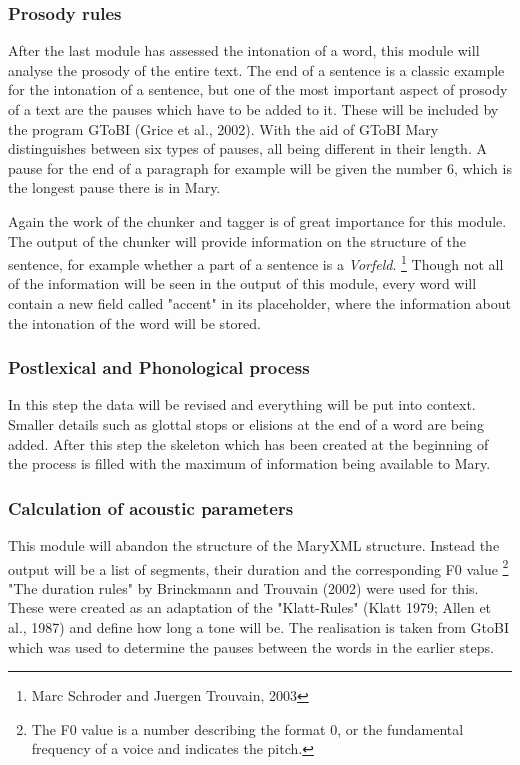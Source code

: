 \documentclass[a4paper, 12pt]{article}
\begin{document}
\subsubsection* {Prosody rules}

After the last module has assessed the intonation of a word, this module will analyse the prosody of the entire text.
The end of a sentence is a classic example for the intonation of a sentence, but one of the most important aspect of prosody of a text are the pauses which have to be added to it.
These will be included by the program GToBI (Grice et al., 2002). 
With the aid of GToBI Mary distinguishes between six types of pauses, all being different in their length.
A pause for the end of a paragraph for example will be given the number 6, which is the longest pause there is in Mary.

Again the work of the chunker and tagger is of great importance for this module.
The output of the chunker will provide information on the structure of the sentence, for example whether a part of a sentence is a \emph{Vorfeld}. \footnote {Marc Schroder and Juergen Trouvain, 2003}
Though not all of the information will be seen in the output of this module, every word will contain a new field called "accent" in its placeholder, where the information about the intonation of the word will be stored.

\subsubsection* {Postlexical and Phonological process}

In this step the data will be revised and everything will be put into context.
Smaller details such as glottal stops or elisions at the end of a word are being added. 
After this step the skeleton which has been created at the beginning of the process is filled with the maximum of information being available to Mary.

\subsubsection* {Calculation of acoustic parameters} 

This module will abandon the structure of the MaryXML structure.
Instead the output will be a list of segments, their duration and the corresponding F0 value \footnote {The F0 value is a number describing the format 0, or the fundamental frequency of a voice and indicates the pitch.}
"The duration rules" by Brinckmann and Trouvain (2002) were used for this. These were created as an adaptation of the  "Klatt-Rules" (Klatt 1979; Allen et al., 1987) and define how long a tone will be.
The realisation is taken from GtoBI which was used to determine the pauses between the words in the earlier steps.
\end{document}
